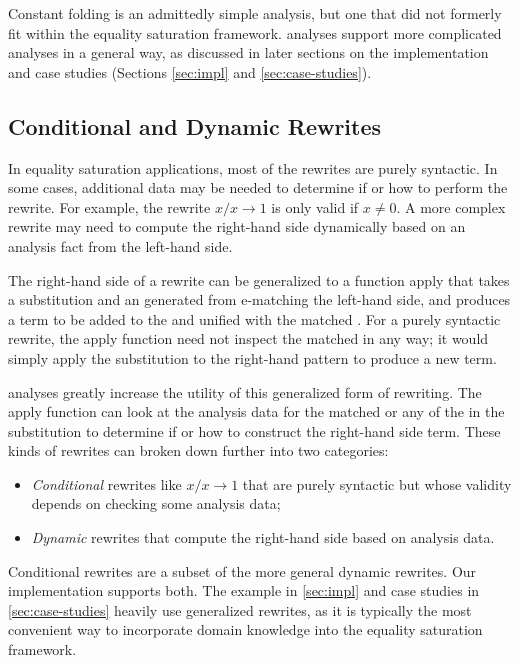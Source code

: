 Constant folding is an admittedly simple analysis, but one that did not formerly
  fit within the equality saturation framework.
\Eclass analyses support more complicated analyses in a general way, as
  discussed in later sections on the \egg implementation and case studies
  (Sections \ref{sec:impl} and \ref{sec:case-studies}).

\subsection{Conditional and Dynamic Rewrites}
\label{sec:rewrites}

In equality saturation applications, most of the rewrites are purely
  syntactic.
In some cases, additional data may be needed to determine if or how to perform
  the rewrite.
For example, the rewrite $x / x \to 1$ is only valid if $x \neq 0$.
A more complex rewrite may need to compute the right-hand side dynamically based
  on an analysis fact from the left-hand side.

The right-hand side of a rewrite can be generalized to a function
  \textsf{apply} that takes a substitution and an \eclass generated from
  e-matching the left-hand side, and produces a term to be added to the \egraph
  and unified with the matched \eclass.
For a purely syntactic rewrite, the \textsf{apply} function need not inspect the
  matched \eclass in any way; it would simply apply
  the substitution to the right-hand pattern to produce a new term.

\Eclass analyses greatly increase the utility of this generalized form of
  rewriting.
The \textsf{apply} function can look at the analysis data for the matched
  \eclass or any of the \eclasses in the substitution to determine if or how to
  construct the right-hand side term.
These kinds of rewrites can broken down further into two categories:
\begin{itemize}
  \item \textit{Conditional} rewrites like $x / x \to 1$ that are purely
  syntactic but whose validity depends on checking some analysis data;
  \item \textit{Dynamic} rewrites that compute the right-hand side based on
  analysis data.
\end{itemize}

Conditional rewrites are a subset of the more general dynamic rewrites.
Our \egg implementation supports both.
The example in \autoref{sec:impl} and case studies in \autoref{sec:case-studies}
  heavily use generalized rewrites, as it is typically the most convenient way
  to incorporate domain knowledge into the equality saturation
  framework.

